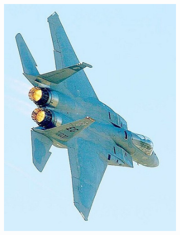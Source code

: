 \documentclass{article} %
\begin{document}
\begin{figure}[t]
  \begin{subfigure}[b]{0.19\linewidth}
    \includegraphics[width=\textwidth]{figs/ab/img/2007_002619}
  \end{subfigure}
  \begin{subfigure}[b]{0.19\linewidth}

\end{subfigure}
\end{figure}
\end{document}
